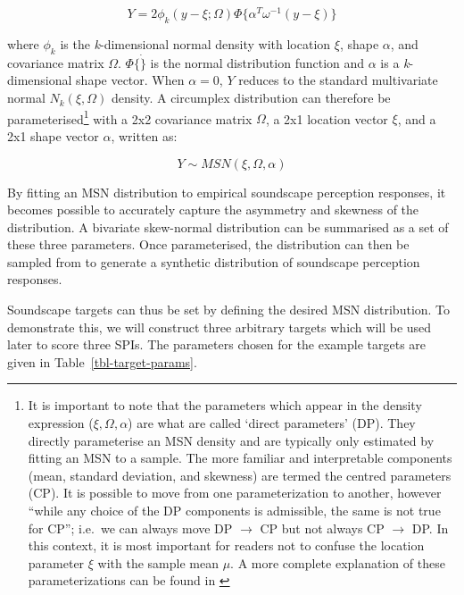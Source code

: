 \documentclass[
  authoryear,
  preprint,
  1p]{elsarticle}
\begin{document}
\[
Y = 2 \phi_k (y-\xi; \Omega) \Phi\{\alpha^T\omega^{-1}(y-\xi)\}
\]

where \(\phi_k\) is the \emph{k}-dimensional normal density with
location \(\xi\), shape \(\alpha\), and covariance matrix \(\Omega\).
\(\Phi \{ \dot \}\) is the normal distribution function and \(\alpha\)
is a \emph{k}-dimensional shape vector. When \(\alpha = 0\), \(Y\)
reduces to the standard multivariate normal \(N_k(\xi, \Omega)\)
density. A circumplex distribution can therefore be
parameterised\footnote{It is important to note that the parameters which
  appear in the density expression (\(\xi, \Omega, \alpha\)) are what
  are called `direct parameters' (DP). They directly parameterise an MSN
  density and are typically only estimated by fitting an MSN to a
  sample. The more familiar and interpretable components (mean, standard
  deviation, and skewness) are termed the centred parameters (CP). It is
  possible to move from one parameterization to another, however ``while
  any choice of the DP components is admissible, the same is not true
  for CP''; i.e.~we can always move DP \(\rightarrow\) CP but not always
  CP \(\rightarrow\) DP. In this context, it is most important for
  readers not to confuse the location parameter \(\xi\) with the sample
  mean \(\mu\). A more complete explanation of these parameterizations
  can be found in \citet{Azzalini2016How}} with a 2x2 covariance matrix
\(\Omega\), a 2x1 location vector \(\xi\), and a 2x1 shape vector
\(\alpha\), written as:

\[
Y \sim MSN (\xi, \Omega, \alpha)
\]

By fitting an MSN distribution to empirical soundscape perception
responses, it becomes possible to accurately capture the asymmetry and
skewness of the distribution. A bivariate skew-normal distribution can
be summarised as a set of these three parameters. Once parameterised,
the distribution can then be sampled from to generate a synthetic
distribution of soundscape perception responses.

Soundscape targets can thus be set by defining the desired MSN
distribution. To demonstrate this, we will construct three arbitrary
targets which will be used later to score three SPIs. The parameters
chosen for the example targets are given in
Table~\ref{tbl-target-params}.
\end{document}
